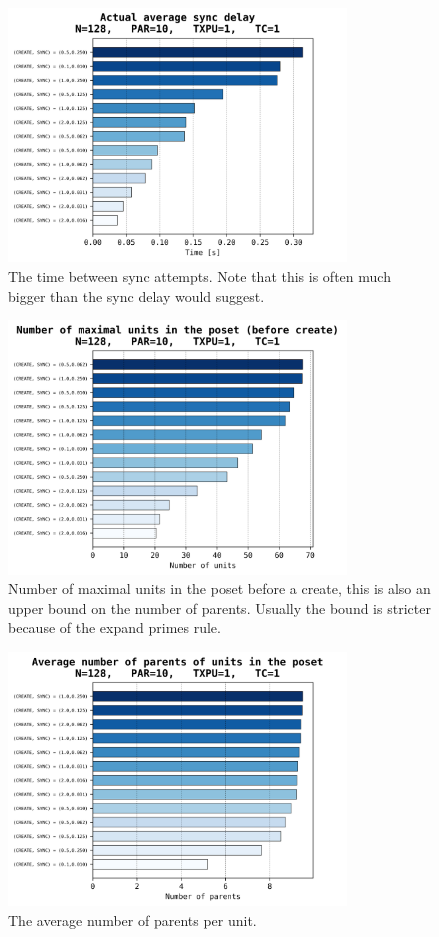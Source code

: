 \documentclass[a4paper,10pt]{article}
\begin{document}
			\begin{figure}[h]
				\centering
				\includegraphics[width=0.8\textwidth]{bar_plots/final_exp1/sync_delay.png}
				\caption{The time between sync attempts. Note that this is often much bigger than the sync delay would suggest.}
				\label{fig:delaysSyncDelay}
			\end{figure}
			\begin{figure}[h]
				\centering
				\includegraphics[width=0.8\textwidth]{bar_plots/final_exp1/n_maximal.png}
				\caption{Number of maximal units in the poset before a create, this is also an upper bound on the number of parents. Usually the bound is stricter because of the expand primes rule.}
				\label{fig:delaysMaximalPreCreate}
			\end{figure}
			\begin{figure}[h]
				\centering
				\includegraphics[width=0.8\textwidth]{bar_plots/final_exp1/n_parents.png}
				\caption{The average number of parents per unit.}
				\label{fig:delaysParents}
			\end{figure}
\end{document}
